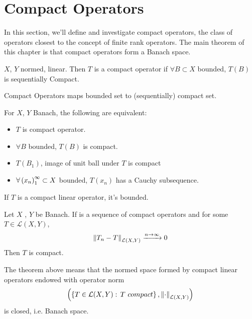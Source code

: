 \newpage
\section{Compact Operators}
In this section, we'll define and investigate compact operators, the class of operators closest to the concept of finite rank operators. The main theorem of this chapter is that compact operators form a Banach space.
\begin{definition}\nl
	$X$, $Y$ normed,  linear. Then $T$ is a compact operator if $\forall B\subset X$ bounded, $T(B)$ is sequentially Compact.

\end{definition}

\begin{remark}\nl
	{\color{blue} Compact Operators maps bounded set to (sequentially) compact set.}
\end{remark}

\begin{lemma}\nl
	For $X$, $Y$ Banach, the following are equivalent:
	\begin{itemize}
		\item $T$ is compact operator.
		\item $\forall B$ bounded, $T(B)$ is compact.
		\item $T(B_1)$, image of unit ball under $T$ is compact
		\item $\forall\left({x_n}\right)_1^\infty\subset X$ bounded, $T(x_n)$ has a Cauchy subsequence.
	\end{itemize}
\end{lemma}

\begin{proposition}\nl
	If $T$ is a compact linear operator, it's bounded.
\end{proposition}

\begin{example}\nl
	\placeholder
\end{example}

\begin{theorem}\nl
	Let $X$ , $Y$ be Banach. If  is a sequence of compact operators and for some $T\in\mathcal{L}(X,Y)$,
	$$
		\left\|{T_n-T}\right\|_{\mathcal{L}(X,Y)}\xrightarrow{n\to\infty}{0}
	$$
	Then $T$ is compact.
\end{theorem}

\begin{remark}\nl
	The theorem above means that the normed space  formed by compact linear operators endowed with operator norm
	$$
		\left(\left\{T\in\mathcal{L}(X,Y):\, T\,\,compact\right\},\left\|{\cdot}\right\|_{\mathcal{L}(X,Y)}\right)
	$$
	is closed, i.e. Banach space.
\end{remark}


